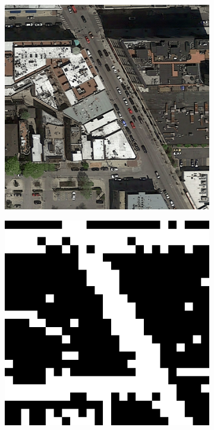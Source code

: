 \documentclass[10pt,conference,compsocconf]{IEEEtran}
\begin{document}
\begin{figure}[ht]
    \vspace{0.5cm}
    
    \begin{subfigure}{0.20\textwidth}
        \centering
        \includegraphics[width=0.9\linewidth]{doc/images/shadow_input.png}
    \end{subfigure}
    \begin{subfigure}{0.20\linewidth}
        \centering
        \includegraphics[width=0.9\linewidth]{doc/images/shadow_cnn.png}

\end{subfigure}
\end{figure}
\end{document}
